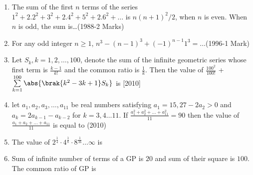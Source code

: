 \begin{enumerate}[label=\thesubsection.\arabic*,ref=\thesubsection.\theenumi]
	     \item The sum of the first $n$ terms of the series ${1^2+2.2^2+3^2+2.4^2+5^2+2.6^2+\dots}$ is
   ${n (n+1)^2 /2}$, when $n$ is even. When $n$ is odd, the sum 
   is\dots\hfill{(1988-2 Marks)}

		  \item For any odd integer $n \ge 1$, ${n^3-(n-1)^3+(-1)^{n-1} 1^3=\dots}$\hfill{(1996-1 Mark)}
\item Let $S_{k}, k = 1,2, \dots , 100$, denote the sum of the infinite geometric series whose first term is  $\frac{k - 1}{k!}$ and the common ratio is $\frac{1}{k}$. Then the value of $\frac{100^{2}}{100!}$ + $\sum\limits_{k=1}^{100} \abs{\brak{k^{2} - 3k +1}S_{k}} $ is \hfill[2010]
\item let $a_{1},a_{2},a_{3},\dots , a_{11}$ be real numbers satisfying $a_{1}= 15, 27 - 2a_{2} > 0$ and $a_{k}=2a_{k-1} - a_{k-2}$ for $k=3,4 \dots 11$. If $\frac{a_{1}^{2} + a_{2}^{2} + \dots +a_{11}^{2}}{11} = 90$ then the value of $\frac{a_{1} + a_{2} +\dots +a_{11}}{11}$ is equal to \hfill(2010)
\item {The value of $2^{\frac{1}{4}}\cdot 4^{\frac{1}{8}}\cdot 8^{\frac{1}{16}} \ldots \infty$ is}
{\hfill{}} 
\begin{enumerate}
\end{enumerate}
\item {Sum of infinite number of terms of a GP is $20$ and sum of their square is $100$. The common ratio of GP is}
{\hfill{}} 
\begin{enumerate}
\end{enumerate} 


\end{enumerate}
